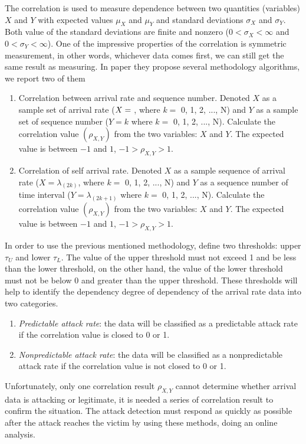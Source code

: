 The correlation is used to measure dependence between two quantities (variables) $X$ and $Y$ with expected values $\mu_X$ and $\mu_Y$ and standard deviations $\sigma_X$ and $\sigma_Y$. Both value of the standard deviations are finite and nonzero ($0 < \sigma_X< \infty$ and $0 < \sigma_Y < \infty$). One of the impressive properties of the correlation is symmetric measurement, in other words, whichever data comes first, we can still get the same result as measuring. In paper \cite{detection_by_path_analaysis} they propose several methodology algorithms, we report two of them
\begin{enumerate}
	\item Correlation between arrival rate and sequence number.
	Denoted $X$ as a sample set of arrival rate ($X = {\label{_k}}$, where $k=$ 0, 1, 2, ..., N) and $Y$ as a sample set of sequence number ($Y = {k}$  where $k=$ 0, 1, 2, ..., N). Calculate the correlation value $(\rho_{X, Y})$ from the two variables: $X$ and $Y$. The expected value is between $-1$ and $1$, $-1 > \rho_{X, Y} > 1 $.
	\item Correlation of self arrival rate. Denoted $X$ as a sample sequence of arrival rate ($X = {\lambda_{(2k)}}$, where $k=$ 0, 1, 2, ..., N) and $Y$ as a sequence number of time interval ($Y = {\lambda_{(2k + 1)}}$ where $k=$ 0, 1, 2, ..., N). Calculate the correlation value $(\rho_{X, Y})$ from the two variables: $X$ and $Y$. The expected value is between $-1$ and $1$, $-1 > \rho_{X, Y} > 1 $.
\end{enumerate}
In order to use the previous mentioned methodology, \cite{detection_by_path_analaysis} define two thresholds: upper $\tau_U$ and lower $\tau_L$. The value of the upper threshold must not exceed 1 and be less than the lower threshold, on the other hand, the value of the lower threshold must not be below 0 and greater than the upper threshold.
These thresholds will help to identify the dependency degree of dependency of the arrival rate data into two categories.
\begin{enumerate}
	\item \textit{Predictable attack rate}: the data will be classified as a predictable attack rate if the correlation value is closed to 0 or 1.
	\item \textit{Nonpredictable attack rate}: the data will be classified as a nonpredictable attack rate if the correlation value is not closed to 0 or 1.
\end{enumerate} 
Unfortunately, only one correlation result $\rho_{X, Y}$ cannot
determine whether arrival data is attacking or legitimate, it is
needed a series of correlation result to confirm the situation.
The attack detection must respond as quickly as possible after the attack reaches the victim by using these methods, doing an online analysis.

